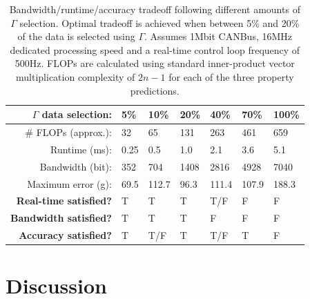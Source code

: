 \begin{center}
\begin{table}[h]
\begin{tabular}{|l|l|l|l|l|l|l|}
\hline
\multicolumn{1}{|r|}{$\Gamma$ data selection:} & 5\%           & 10\%          & 20\%          & 40\%          & 70\%          & 100\%  \\ \hline
\multicolumn{1}{|r|}{\# FLOPs (approx.):}      & 32             & 65           & 131          & 263          & 461          & 659 \\ \hline
\multicolumn{1}{|r|}{Runtime (ms):}    & 0.25          & 0.5          & 1.0         & 2.1           & 3.6         & 5.1 \\ \hline
\multicolumn{1}{|r|}{Bandwidth (bit):} & 352             & 704           & 1408          & 2816          & 4928          & 7040          \\ \hline
\multicolumn{1}{|r|}{Maximum error (g):} & 69.5 & 112.7 & 96.3 & 111.4 &  107.9 & 188.3 \\ \hline
\multicolumn{1}{|r|}{\textbf{Real-time satisfied?}}        & T           & T         & T         & T/F   & F        & F        \\ \hline
\multicolumn{1}{|r|}{\textbf{Bandwidth satisfied?}}       & T           & T         & T         & F   & F        & F        \\ \hline
\multicolumn{1}{|r|}{\textbf{Accuracy satisfied?}}        & T           & T/F       & T         & T/F     & T        & F        \\ \hline
\end{tabular}
\caption{Bandwidth/runtime/accuracy tradeoff following different amounts of $\Gamma$ selection. Optimal tradeoff is achieved when between 5\% and 20\% of the data is selected using $\Gamma$. Assumes 1Mbit CANBus, 16MHz dedicated processing speed and a real-time control loop frequency of 500Hz. FLOPs are calculated using standard inner-product vector multiplication complexity of $2n-1$ for each of the three property predictions.}
\label{tbl:tradeoff}
\end{table}
\end{center}

\section{Discussion}


